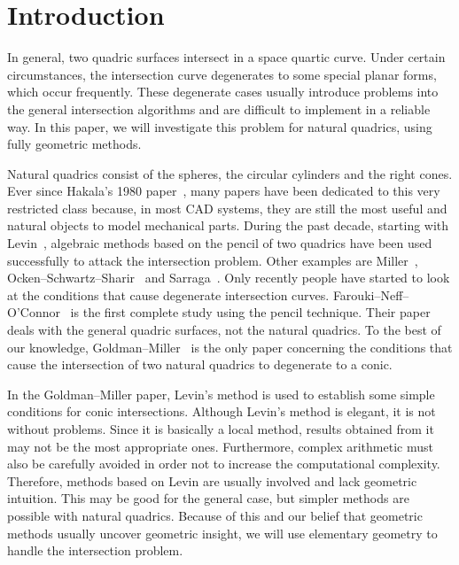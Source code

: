 

\section{Introduction}
\label{section:introduction}
     In general, two quadric surfaces intersect in a space quartic curve.
Under certain circumstances, the intersection curve degenerates to  some
special planar forms, which occur frequently.  These degenerate cases usually 
introduce problems into the general intersection algorithms and are difficult 
to implement in a reliable way.  In this paper, we will investigate this 
problem for natural quadrics, using fully geometric methods. 

     Natural quadrics consist of the spheres, the circular cylinders and 
the right cones.  Ever since Hakala's 1980 paper~\cite{hakala:1980}, many 
papers have been dedicated to this very restricted class because, in most CAD 
systems, they are still the most useful and natural objects to model 
mechanical parts.  During the past decade, starting with 
Levin~\cite{levin:1976,levin:1979}, algebraic methods based on the pencil of 
two quadrics have been used successfully to attack the intersection problem.  
Other examples are Miller~\cite{miller:1987}, 
Ocken--Schwartz--Sharir~\cite{ocken:1987} and Sarraga~\cite{sarraga:1983}.  
Only recently people have started to look at the conditions that cause 
degenerate intersection curves.  Farouki--Neff--O'Connor~\cite{farouki:1989} 
is the first complete study using the pencil technique.  Their paper deals 
with the general quadric surfaces, not the natural quadrics.  To the best of 
our knowledge, Goldman--Miller~\cite{goldman:1990} is the only paper 
concerning the conditions that cause the intersection of two natural quadrics 
to degenerate to a conic.  

     In the Goldman--Miller paper, Levin's method is used to establish some 
simple conditions for conic intersections.  Although Levin's method is elegant,
it is not without problems.  Since it is basically a local method, results 
obtained from it may not be the most appropriate ones.  Furthermore, complex 
arithmetic must also be carefully avoided in order not to increase the 
computational complexity.  Therefore, methods based on Levin are usually 
involved and lack geometric intuition.  This may be good for the general case,
but simpler methods are possible with natural quadrics.  Because of this and 
our belief that geometric methods usually uncover geometric insight, we will 
use elementary geometry to handle the intersection problem.

